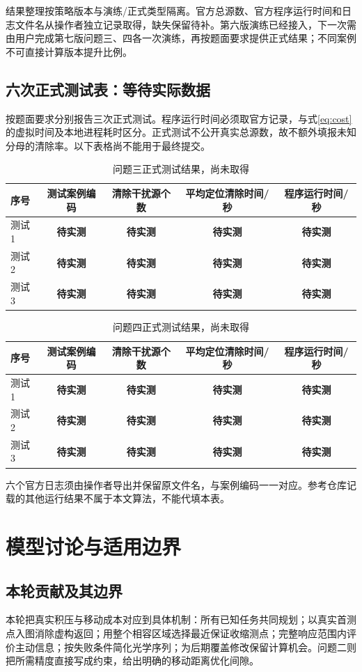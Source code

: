 \documentclass[UTF8,a4paper,zihao=-4,fontset=windows]{ctexart}
\newcommand{\pending}{\textbf{待实测}}
\begin{document}
结果整理按策略版本与演练/正式类型隔离。官方总源数、官方程序运行时间和日志文件名从操作者独立记录取得，缺失保留待补。第六版演练已经接入，下一次需由用户完成第七版问题三、四各一次演练，再按题面要求提供正式结果；不同案例不可直接计算版本提升比例。

\subsection{六次正式测试表：等待实际数据}
按题面要求分别报告三次正式测试。程序运行时间必须取官方记录，与式\eqref{eq:cost}的虚拟时间及本地进程耗时区分。正式测试不公开真实总源数，故不额外填报未知分母的清除率。以下表格尚不能用于最终提交。
\begin{table}[htbp]\centering\caption{问题三正式测试结果，尚未取得}
\begin{tabular}{lcccc}\toprule
序号&测试案例编码&清除干扰源个数&平均定位清除时间/秒&程序运行时间/秒\\\midrule
测试1&\pending&\pending&\pending&\pending\\
测试2&\pending&\pending&\pending&\pending\\
测试3&\pending&\pending&\pending&\pending\\\bottomrule
\end{tabular}
\end{table}
\begin{table}[htbp]\centering\caption{问题四正式测试结果，尚未取得}
\begin{tabular}{lcccc}\toprule
序号&测试案例编码&清除干扰源个数&平均定位清除时间/秒&程序运行时间/秒\\\midrule
测试1&\pending&\pending&\pending&\pending\\
测试2&\pending&\pending&\pending&\pending\\
测试3&\pending&\pending&\pending&\pending\\\bottomrule
\end{tabular}
\end{table}
六个官方日志须由操作者导出并保留原文件名，与案例编码一一对应。参考仓库记载的其他运行结果不属于本文算法，不能代填本表。


\section{模型讨论与适用边界}

\subsection{本轮贡献及其边界}
本轮把真实积压与移动成本对应到具体机制：所有已知任务共同规划；以真实首测点入图消除虚构返回；用整个相容区域选择最近保证收缩测点；完整响应范围内评价主动信息；按失败条件简化光学序列；为后期覆盖修改保留计算机会。问题二则把所需精度直接写成约束，给出明确的移动距离优化间隙。
\end{document}
